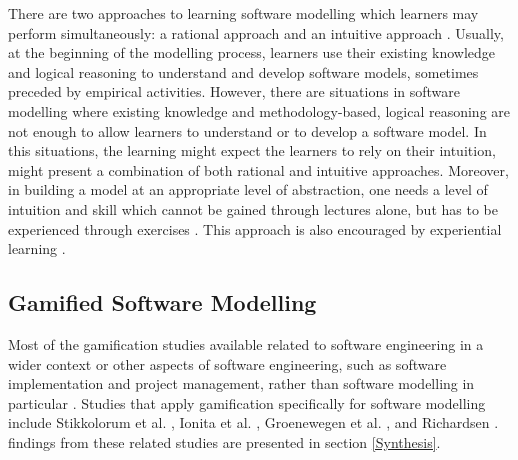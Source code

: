 \documentclass[12pt, a4paper]{report}
\begin{document}
{There are two approaches to learning software modelling which learners may perform simultaneously: a rational approach and an intuitive approach \cite{bobkowska2014software}. Usually, at the beginning of the modelling process, learners use their existing knowledge and logical reasoning to understand and develop software models, sometimes preceded by empirical activities. However, there are situations in software modelling where existing knowledge and methodology-based, logical reasoning are not enough to allow learners to understand or to develop a software model. In this situations, the learning might expect the learners to rely on their intuition, might present a combination of both rational and intuitive approaches. Moreover, in building a model at an appropriate level of abstraction, one needs a level of intuition and skill which cannot be gained through lectures alone, but has to be experienced through exercises \cite{engels2005teaching}. This approach is also encouraged by experiential learning \cite{kolb2014experiential}.   

\subsection{Gamified Software Modelling}
\label{Gamified Software Modelling}
Most of the gamification studies available related to software engineering in a wider context or other aspects of software engineering, such as software implementation and project management, rather than software modelling in particular \cite{Pedreira2015}. Studies that apply gamification specifically for software modelling include Stikkolorum et al. \cite{Stikkolorum2014}, Ionita et al. \cite{Ionita2015}, Groenewegen et al. \cite{Groenewegen2010}, and Richardsen \cite{Richardsen2014}. findings from these related studies are presented in section \ref{Synthesis}.

}
\end{document}
